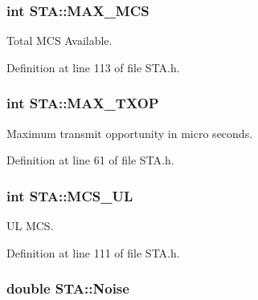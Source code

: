 \hypertarget{classSTA_a5c5df3db89aa13fc409c4c0d6f8924d2}{
\subsubsection[{M\-A\-X\-\_\-\-M\-C\-S}]{\setlength{\rightskip}{0pt plus 5cm}int S\-T\-A\-::\-M\-A\-X\-\_\-\-M\-C\-S}}\label{classSTA_a5c5df3db89aa13fc409c4c0d6f8924d2}


Total M\-C\-S Available. 



Definition at line 113 of file S\-T\-A.\-h.

\hypertarget{classSTA_a285a258f933915b75a6de0460ff6f099}{
\subsubsection[{M\-A\-X\-\_\-\-T\-X\-O\-P}]{\setlength{\rightskip}{0pt plus 5cm}int S\-T\-A\-::\-M\-A\-X\-\_\-\-T\-X\-O\-P\hspace{0.3cm}{\ttfamily [private]}}}\label{classSTA_a285a258f933915b75a6de0460ff6f099}


Maximum transmit opportunity in micro seconds. 



Definition at line 61 of file S\-T\-A.\-h.

\hypertarget{classSTA_a21e0611dde6754144f220cc7312d5909}{
\subsubsection[{M\-C\-S\-\_\-\-U\-L}]{\setlength{\rightskip}{0pt plus 5cm}int S\-T\-A\-::\-M\-C\-S\-\_\-\-U\-L}}\label{classSTA_a21e0611dde6754144f220cc7312d5909}


U\-L M\-C\-S. 



Definition at line 111 of file S\-T\-A.\-h.

\hypertarget{classSTA_ae9a319d9b58f28610defc9e0fc51aa60}{
\subsubsection[{Noise}]{\setlength{\rightskip}{0pt plus 5cm}double S\-T\-A\-::\-Noise\hspace{0.3cm}{\ttfamily [private]}}}\label{classSTA_ae9a319d9b58f28610defc9e0fc51aa60}


